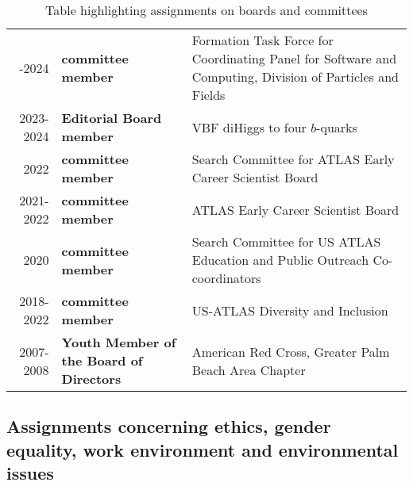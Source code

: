 \begin{table}[h!]
	\centering
	\footnotesize
	\caption{Table highlighting assignments on boards and committees}
	\begin{tabular}{r|>{\bfseries}lp{20em}}
		\centering
		2023-2024 & committee member                       & Formation Task Force for Coordinating Panel for Software and Computing, Division of Particles and Fields \\
		2023-2024 & Editorial Board member                 & VBF diHiggs to four $b$-quarks                                                                           \\
		2022      & committee member                       & Search Committee for ATLAS Early Career Scientist Board                                                  \\
		2021-2022 & committee member                       & ATLAS Early Career Scientist Board                                                                       \\
		2020      & committee member                       & Search Committee for US ATLAS Education and Public Outreach Co-coordinators                              \\
		2018-2022 & committee member                       & US-ATLAS Diversity and Inclusion                                                                         \\
		2007-2008 & Youth Member of the Board of Directors & American Red Cross, Greater Palm Beach Area Chapter                                                      \\
	\end{tabular}
\end{table}

\subsection{Assignments concerning ethics, gender equality, work environment and environmental issues} \label{ssec:assignments-concerning-ethics-gender-equality-work-environment-and-environmental-issues}

